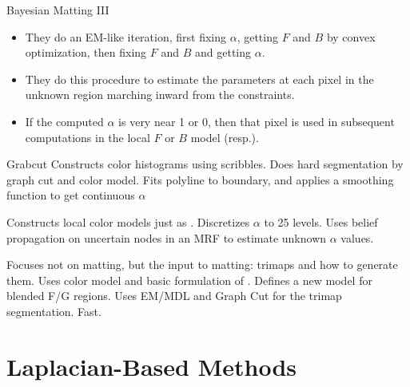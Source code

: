 \documentclass{beamer}
\begin{document}
\begin{frame}{Bayesian Matting \cite{chuang2001bayesian} III}
 \begin{itemize}
  \item They do an EM-like iteration, first fixing $\alpha$, getting $F$ and $B$ by
        convex optimization, then fixing $F$ and $B$ and getting $\alpha$.
  \item They do this procedure to estimate the parameters at each pixel in the
        unknown region marching inward from the constraints.
  \item If the computed $\alpha$ is very near 1 or 0, then that pixel is used in
        subsequent computations in the local $F$ or $B$ model (resp.).
 \end{itemize}
\end{frame}

\begin{frame}[allowframebreaks]{Grabcut \cite{rother2004grabcut}}
 Constructs color histograms using scribbles.
 Does hard segmentation by graph cut and color model.
 Fits polyline to boundary, and applies a smoothing function to get continuous $\alpha$
\end{frame}

\begin{frame}[allowframebreaks]{\cite{wang2005iterative}}
 Constructs local color models just as \cite{chuang2001bayesian}.
 Discretizes $\alpha$ to 25 levels.
 Uses belief propagation on uncertain nodes in an MRF to estimate unknown $\alpha$ values.
\end{frame}

\begin{frame}[allowframebreaks]{\cite{juan2005trimap}}
 Focuses not on matting, but the input to matting: trimaps and how to generate them.
 Uses color model and basic formulation of \cite{rother2004grabcut}.
 Defines a new model for blended F/G regions.
 Uses EM/MDL and Graph Cut for the trimap segmentation.
 Fast.
\end{frame}

\section{Laplacian-Based Methods}%
\end{document}

